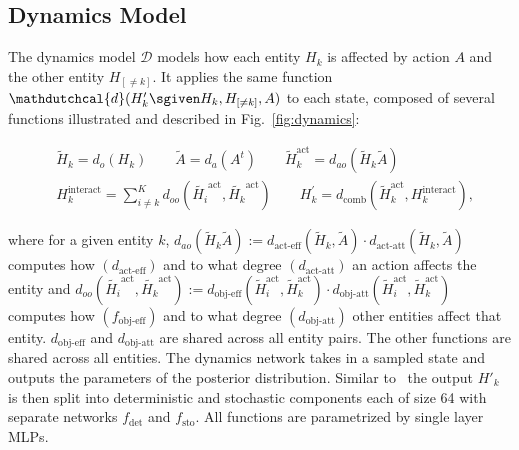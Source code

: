 \subsection{Dynamics Model} \label{appdx:dyn_model}
The dynamics model $\mathcal{D}$ models how each entity $H_k$ is affected by action $A$ and the other entity $H_{[\neq k]}$.
It applies the same function $\mathdutchcal{d}(H_k' \sgiven H_k, H_{[\neq k]}, A)$ to each state, composed of several functions illustrated and described in Fig.~\ref{fig:dynamics}:
\begin{footnotesize}
\begin{align*}
&\tilde{H}_k = d_{o}(H_k) \qquad
\tilde{A} = d_{a}(A^t) \qquad
\tilde{H}_k^{\text{act}} = d_{ao}(\tilde{H}_k \tilde{A}) \\
&H_k^{\text{interact}} = \sum_{i \neq k}^K d_{oo}(\tilde{H_i}^{\text{act}}, \tilde{H_k}^{\text{act}}) \qquad
H_{k}^{'} = d_{\text{comb}}(\tilde{H}_k^{\text{act}}, H_k^{\text{interact}}),
\end{align*}
\end{footnotesize}
where for a given entity $k$, $d_{ao}(\tilde{H}_k \tilde{A}) := d_{\text{act-eff}}(\tilde{H}_k, \tilde{A}) \cdot d_{\text{act-att}}(\tilde{H}_k, \tilde{A})$ computes how $(d_{\text{act-eff}})$ and to what degree $(d_{\text{act-att}})$ an action affects the entity and $d_{oo}(\tilde{H_i}^{\text{act}}, \tilde{H_k}^{\text{act}}) := d_{\text{obj-eff}}(\tilde{H}_i^{\text{act}}, \tilde{H}_k^{\text{act}}) \cdot d_{\text{obj-att}}(\tilde{H}_i^{\text{act}}, \tilde{H}_k^{\text{act}}
)$ computes how $(f_{\text{obj-eff}})$ and to what degree $(d_{\text{obj-att}})$ other entities affect that entity.
$d_{\text{obj-eff}}$ and $d_{\text{obj-att}}$ are shared across all entity pairs. The other functions are shared across all entities. The dynamics network takes in a sampled state and outputs the parameters of the posterior distribution. Similar to~\citep{hafner2018learning} the output $H'_k$ is then split into deterministic and stochastic components each of size 64 with separate networks $f_{\text{det}}$ and $f_{\text{sto}}$. All functions are parametrized by single layer MLPs.

